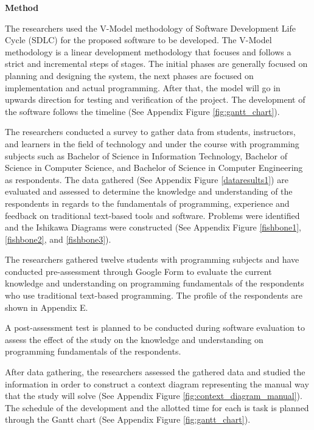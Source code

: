\flushleft
\textbf{Method}\\
\justifying

\parx
The researchers used the V-Model methodology of Software
Development Life Cycle (SDLC) for the proposed software to be developed. The
V-Model methodology is a linear development methodology that focuses and follows
a strict and incremental steps of stages. The initial phases are generally
focused on planning and designing the system, the next phases are focused on
implementation and actual programming. After that, the model will go in upwards
direction for testing and verification of the project. The development of the
software follows the timeline (See Appendix Figure \ref{fig:gantt_chart}).

\parx
The researchers conducted a survey to gather data from students, instructors,
and learners in the field of technology and under the course with programming
subjects such as Bachelor of Science in Information Technology, Bachelor of
Science in Computer Science, and Bachelor of Science in Computer Engineering as
respondents. The data gathered (See Appendix Figure \ref{dataresults1}) are
evaluated and assessed to determine the knowledge and understanding of the
respondents in regards to the fundamentals of programming, experience and
feedback on traditional text-based tools and software. Problems were identified
and the Ishikawa Diagrams were constructed (See Appendix Figure
\ref{fishbone1}, \ref{fishbone2}, and \ref{fishbone3}).

\parx
The researchers gathered twelve students with programming subjects and have
conducted pre-assessment through Google Form to evaluate the current knowledge
and understanding on programming fundamentals of the respondents who use traditional
text-based programming. The profile of the respondents are shown in Appendix E.



\parx
A post-assessment test is planned to be conducted during software evaluation to
assess the effect of the study on the knowledge and understanding on programming
fundamentals of the respondents.

\parx
After data gathering, the researchers assessed the gathered data and studied the
information in order to construct a context diagram representing the manual way
that the study will solve (See Appendix Figure
\ref{fig:context_diagram_manual}). The schedule of the development and the
allotted time for each is task is planned through the Gantt chart (See Appendix
Figure \ref{fig:gantt_chart}).

